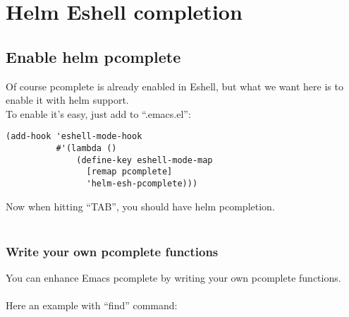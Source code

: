 \documentclass[a4paper,11pt]{article}
\newenvironment{encadre}{%
  \begin{lrbox}{\boiteencadre}%
  \begin{minipage}{.8\textwidth}}{%
  \end{minipage}
  \end{lrbox}%
  \begin{center}
    \fbox{\usebox{\boiteencadre}}
  \end{center}}
\begin{document}
\section{Helm Eshell completion}
\label{sec:anyth-eshell-compl}

\subsection{Enable helm pcomplete}
\label{sec:enable-anyth-pcompl}


Of course pcomplete is already enabled in Eshell, but what we want here 
is to enable it with helm support. \\
To enable it's easy, just add to ``.emacs.el'':

\begin{encadre}
\begin{verbatim}
(add-hook 'eshell-mode-hook
          #'(lambda ()
              (define-key eshell-mode-map 
                [remap pcomplete]
                'helm-esh-pcomplete)))

\end{verbatim}
\end{encadre}

Now when hitting ``TAB'', you should have helm pcompletion.\\
\\

\subsubsection{Write your own pcomplete functions}
\label{sec:write-your-own}

You can enhance Emacs pcomplete by writing your own pcomplete functions.\\
\\
Here an example with ``find'' command:
\end{document}
